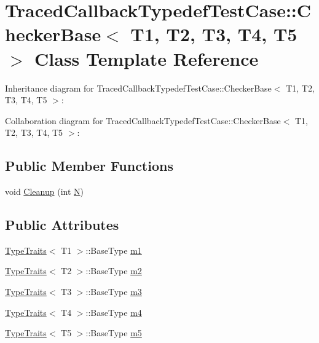 \hypertarget{classTracedCallbackTypedefTestCase_1_1CheckerBase}{}\section{Traced\+Callback\+Typedef\+Test\+Case\+:\+:Checker\+Base$<$ T1, T2, T3, T4, T5 $>$ Class Template Reference}
\label{classTracedCallbackTypedefTestCase_1_1CheckerBase}


Inheritance diagram for Traced\+Callback\+Typedef\+Test\+Case\+:\+:Checker\+Base$<$ T1, T2, T3, T4, T5 $>$\+:


Collaboration diagram for Traced\+Callback\+Typedef\+Test\+Case\+:\+:Checker\+Base$<$ T1, T2, T3, T4, T5 $>$\+:
\subsection*{Public Member Functions}
\begin{DoxyCompactItemize}
\item 
void \hyperlink{classTracedCallbackTypedefTestCase_1_1CheckerBase_a69a157ab314e0a84bd22a7f4b030dcf4}{Cleanup} (int \hyperlink{loss__ITU1238_8m_aaa6c78b1d659f53598dbe891c1139b3e}{N})
\end{DoxyCompactItemize}
\subsection*{Public Attributes}
\begin{DoxyCompactItemize}
\item 
\hyperlink{structTypeTraits}{Type\+Traits}$<$ T1 $>$\+::Base\+Type \hyperlink{classTracedCallbackTypedefTestCase_1_1CheckerBase_a98f287e2e2d5ffcaae0d995203474530}{m1}
\item 
\hyperlink{structTypeTraits}{Type\+Traits}$<$ T2 $>$\+::Base\+Type \hyperlink{classTracedCallbackTypedefTestCase_1_1CheckerBase_a7e8752868bfda72ec0eac73e91f3742f}{m2}
\item 
\hyperlink{structTypeTraits}{Type\+Traits}$<$ T3 $>$\+::Base\+Type \hyperlink{classTracedCallbackTypedefTestCase_1_1CheckerBase_a3c03c3cb843029393002cb8ad318b61a}{m3}
\item 
\hyperlink{structTypeTraits}{Type\+Traits}$<$ T4 $>$\+::Base\+Type \hyperlink{classTracedCallbackTypedefTestCase_1_1CheckerBase_ae8e8ea34137d3a8ad4fca2e6a11e6d29}{m4}
\item 
\hyperlink{structTypeTraits}{Type\+Traits}$<$ T5 $>$\+::Base\+Type \hyperlink{classTracedCallbackTypedefTestCase_1_1CheckerBase_a839827d99a0628d5fe37f1d55d711a96}{m5}
\end{DoxyCompactItemize}
